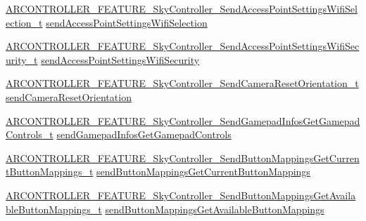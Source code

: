 \begin{DoxyCompactItemize}
\item 
\hyperlink{_a_r_c_o_n_t_r_o_l_l_e_r___feature_8h_a858ea56e0cac217c2ce9d44a845fc0ef}{A\+R\+C\+O\+N\+T\+R\+O\+L\+L\+E\+R\+\_\+\+F\+E\+A\+T\+U\+R\+E\+\_\+\+Sky\+Controller\+\_\+\+Send\+Access\+Point\+Settings\+Wifi\+Selection\+\_\+t} \hyperlink{struct_a_r_c_o_n_t_r_o_l_l_e_r___f_e_a_t_u_r_e___sky_controller__t_ab720c75a9f23394838c9b0ca2ba51079}{send\+Access\+Point\+Settings\+Wifi\+Selection}
\item 
\hyperlink{_a_r_c_o_n_t_r_o_l_l_e_r___feature_8h_ae776a028de0534ff917e01daefc766e2}{A\+R\+C\+O\+N\+T\+R\+O\+L\+L\+E\+R\+\_\+\+F\+E\+A\+T\+U\+R\+E\+\_\+\+Sky\+Controller\+\_\+\+Send\+Access\+Point\+Settings\+Wifi\+Security\+\_\+t} \hyperlink{struct_a_r_c_o_n_t_r_o_l_l_e_r___f_e_a_t_u_r_e___sky_controller__t_acade516ae39594ae13c6e6ca3d5efde9}{send\+Access\+Point\+Settings\+Wifi\+Security}
\item 
\hyperlink{_a_r_c_o_n_t_r_o_l_l_e_r___feature_8h_a073744a7c4fdaf9620aa6a62dc192363}{A\+R\+C\+O\+N\+T\+R\+O\+L\+L\+E\+R\+\_\+\+F\+E\+A\+T\+U\+R\+E\+\_\+\+Sky\+Controller\+\_\+\+Send\+Camera\+Reset\+Orientation\+\_\+t} \hyperlink{struct_a_r_c_o_n_t_r_o_l_l_e_r___f_e_a_t_u_r_e___sky_controller__t_af0b17bc58010933945fe37d7ad1cec3a}{send\+Camera\+Reset\+Orientation}
\item 
\hyperlink{_a_r_c_o_n_t_r_o_l_l_e_r___feature_8h_a692a142189bca2648adcc1c2cf53e898}{A\+R\+C\+O\+N\+T\+R\+O\+L\+L\+E\+R\+\_\+\+F\+E\+A\+T\+U\+R\+E\+\_\+\+Sky\+Controller\+\_\+\+Send\+Gamepad\+Infos\+Get\+Gamepad\+Controls\+\_\+t} \hyperlink{struct_a_r_c_o_n_t_r_o_l_l_e_r___f_e_a_t_u_r_e___sky_controller__t_a14b4b1a7eba676b260509c439e8f84c4}{send\+Gamepad\+Infos\+Get\+Gamepad\+Controls}
\item 
\hyperlink{_a_r_c_o_n_t_r_o_l_l_e_r___feature_8h_a44c2e7dc915cac38139984b66661ad6f}{A\+R\+C\+O\+N\+T\+R\+O\+L\+L\+E\+R\+\_\+\+F\+E\+A\+T\+U\+R\+E\+\_\+\+Sky\+Controller\+\_\+\+Send\+Button\+Mappings\+Get\+Current\+Button\+Mappings\+\_\+t} \hyperlink{struct_a_r_c_o_n_t_r_o_l_l_e_r___f_e_a_t_u_r_e___sky_controller__t_a083c9de40f6a475785803985893b1897}{send\+Button\+Mappings\+Get\+Current\+Button\+Mappings}
\item 
\hyperlink{_a_r_c_o_n_t_r_o_l_l_e_r___feature_8h_abe04317331838151506b69b122fc6794}{A\+R\+C\+O\+N\+T\+R\+O\+L\+L\+E\+R\+\_\+\+F\+E\+A\+T\+U\+R\+E\+\_\+\+Sky\+Controller\+\_\+\+Send\+Button\+Mappings\+Get\+Available\+Button\+Mappings\+\_\+t} \hyperlink{struct_a_r_c_o_n_t_r_o_l_l_e_r___f_e_a_t_u_r_e___sky_controller__t_aa74e3c61b452ea2270e960cd8a10e82e}{send\+Button\+Mappings\+Get\+Available\+Button\+Mappings}

\end{DoxyCompactItemize}
